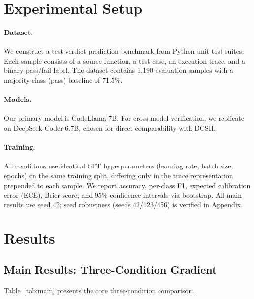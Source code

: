 \documentclass[11pt,a4paper]{article}
\begin{document}
\section{Experimental Setup}
\label{sec:setup}

\paragraph{Dataset.}
We construct a test verdict prediction benchmark from Python unit test suites.
Each sample consists of a source function, a test case, an execution trace, and a binary pass/fail label.
The dataset contains 1{,}190 evaluation samples with a majority-class (pass) baseline of 71.5\%.

\paragraph{Models.}
Our primary model is CodeLlama-7B.
For cross-model verification, we replicate on DeepSeek-Coder-6.7B, chosen for direct comparability with DCSH.

\paragraph{Training.}
All conditions use identical SFT hyperparameters (learning rate, batch size, epochs) on the same training split, differing only in the trace representation prepended to each sample.
We report accuracy, per-class F1, expected calibration error (ECE), Brier score, and 95\% confidence intervals via bootstrap.
All main results use seed 42; seed robustness (seeds 42/123/456) is verified in Appendix.

\section{Results}
\label{sec:results}

\subsection{Main Results: Three-Condition Gradient}
\label{sec:main_results}

Table~\ref{tab:main} presents the core three-condition comparison.
\end{document}
